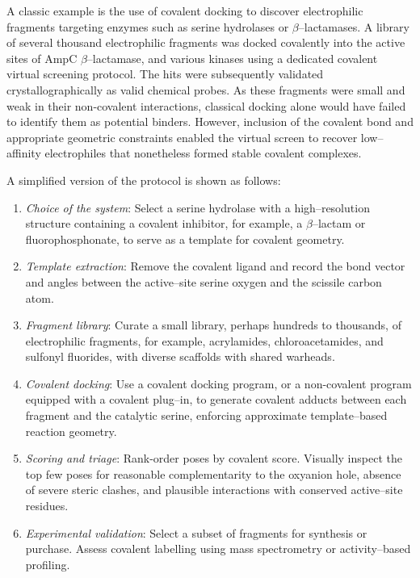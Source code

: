 \documentclass[12pt]{article}
\begin{document}
A classic example is the use of covalent docking to discover electrophilic fragments targeting enzymes such as serine hydrolases or $\beta$–lactamases. A library of several thousand electrophilic fragments was docked covalently into the active sites of AmpC $\beta$–lactamase\cite{CH14_babaoglu2008comprehensive}, and various kinases using a dedicated covalent virtual screening protocol. The hits were subsequently validated crystallographically as valid chemical probes. As these fragments were small and weak in their non-covalent interactions, classical docking alone would have failed to identify them as potential binders. However, inclusion of the covalent bond and appropriate geometric constraints enabled the virtual screen to recover low–affinity electrophiles that nonetheless formed stable covalent complexes.

A simplified version of the protocol is shown as follows:

\begin{enumerate}
  \item \emph{Choice of the system}: Select a serine hydrolase with a high–resolution structure containing a covalent inhibitor, for example, a $\beta$–lactam or fluorophosphonate, to serve as a template for covalent geometry.  
  \item \emph{Template extraction}: Remove the covalent ligand and record the bond vector and angles between the active–site serine oxygen and the scissile carbon atom.  
  \item \emph{Fragment library}: Curate a small library, perhaps hundreds to thousands, of electrophilic fragments, for example, acrylamides, chloroacetamides, and sulfonyl fluorides, with diverse scaffolds with shared warheads.  
  \item \emph{Covalent docking}: Use a covalent docking program, or a non-covalent program equipped with a covalent plug–in, to generate covalent adducts between each fragment and the catalytic serine, enforcing approximate template–based reaction geometry.  
  \item \emph{Scoring and triage}: Rank-order poses by covalent score. Visually inspect the top few poses for reasonable complementarity to the oxyanion hole, absence of severe steric clashes, and plausible interactions with conserved active–site residues.  
  \item \emph{Experimental validation}: Select a subset of fragments for synthesis or purchase. Assess covalent labelling using mass spectrometry or activity–based profiling.
\end{enumerate}
\end{document}
